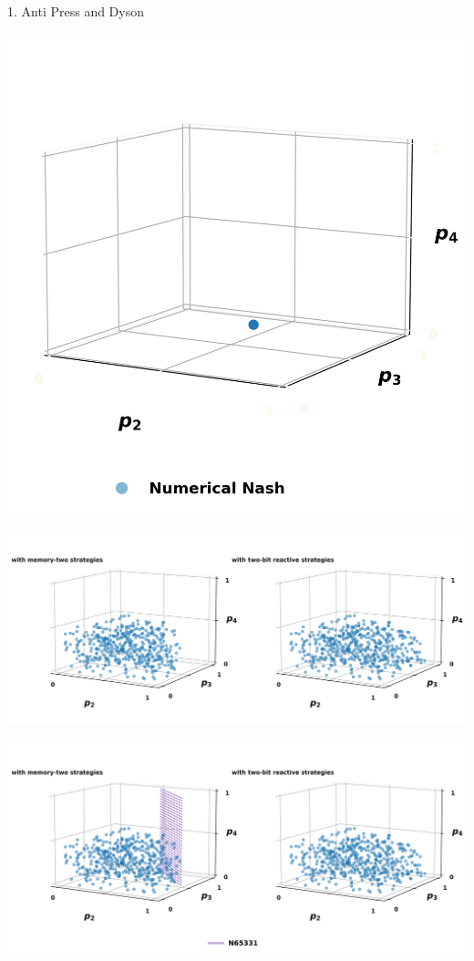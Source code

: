 \documentclass{beamer}
\begin{document}
\begin{frame}
    \begin{center}
        \Large 1. Anti Press and Dyson
    \end{center}
\end{frame}

\begin{frame}
    \begin{center}
        \includegraphics[width=.65\textwidth]{static/two}
    \end{center}
\end{frame}

\begin{frame}
    \begin{center}
        \includegraphics[width=\textwidth]{static/five_b}
    \end{center}
\end{frame}

\begin{frame}
    \begin{center}
        \includegraphics[width=\textwidth]{static/six_b}
    \end{center}
\end{frame}
\end{document}
